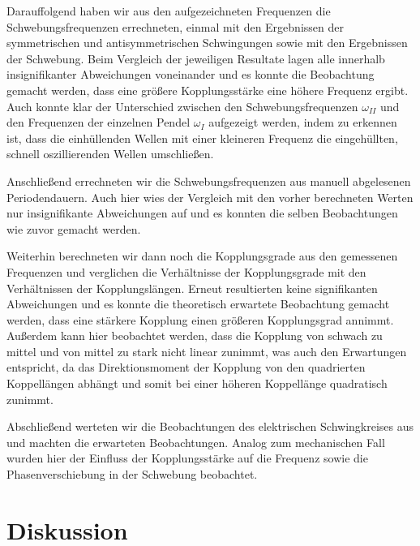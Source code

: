 \documentclass{article}
\begin{document}
Darauffolgend haben wir aus den aufgezeichneten Frequenzen die Schwebungsfrequenzen errechneten, einmal mit den Ergebnissen der symmetrischen und antisymmetrischen Schwingungen sowie mit den Ergebnissen der Schwebung. Beim Vergleich der jeweiligen Resultate lagen alle innerhalb insignifikanter Abweichungen voneinander und es konnte die Beobachtung gemacht werden, dass eine größere Kopplungsstärke eine höhere Frequenz ergibt. Auch konnte klar der Unterschied zwischen den Schwebungsfrequenzen $\omega_{II}$ und den Frequenzen der einzelnen Pendel $\omega_I$ aufgezeigt werden, indem zu erkennen ist, dass die einhüllenden Wellen mit einer kleineren Frequenz die eingehüllten, schnell oszillierenden Wellen umschließen.

Anschließend errechneten wir die Schwebungsfrequenzen aus manuell abgelesenen Periodendauern. Auch hier wies der Vergleich mit den vorher berechneten Werten nur insignifikante Abweichungen auf und es konnten die selben Beobachtungen wie zuvor gemacht werden.

Weiterhin berechneten wir dann noch die Kopplungsgrade aus den gemessenen Frequenzen und verglichen die Verhältnisse der Kopplungsgrade mit den Verhältnissen der Kopplungslängen. Erneut resultierten keine signifikanten Abweichungen und es konnte die theoretisch erwartete Beobachtung gemacht werden, dass eine stärkere Kopplung einen größeren Kopplungsgrad annimmt. Außerdem kann hier beobachtet werden, dass die Kopplung von schwach zu mittel und von mittel zu stark nicht linear zunimmt, was auch den Erwartungen entspricht, da das Direktionsmoment der Kopplung von den quadrierten Koppellängen abhängt und somit bei einer höheren Koppellänge quadratisch zunimmt. 

Abschließend werteten wir die Beobachtungen des elektrischen Schwingkreises aus und machten die erwarteten Beobachtungen. Analog zum mechanischen Fall wurden hier der Einfluss der Kopplungsstärke auf die Frequenz sowie die Phasenverschiebung in der Schwebung beobachtet.

\newpage
\section{Diskussion}
\end{document}
